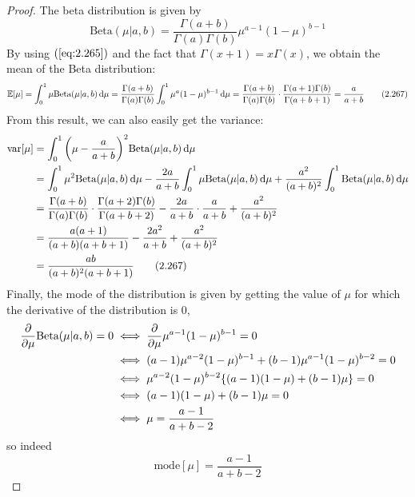 \vspace{1em}

\begin{proof}
    The beta distribution is given by
    \begin{equation*}
        \text{Beta}(\mu | a, b) = \frac{\Gamma(a + b)}{\Gamma(a)\Gamma(b)} \mu^{a - 1}(1 - \mu)^{b - 1}
        \tag{2.13}\label{eq:2.13}
    \end{equation*}
    By using $(\ref{eq:2.265})$ and the fact that $\Gamma(x + 1) = x\Gamma(x)$, we 
    obtain the mean of the Beta distribution:
    \begin{align*}
        \mathbb{E}[\mu] 
        = \int_{0}^{1} \mu \text{Beta}(\mu | a, b) \mathop{}\!\mathrm{d} \mu 
        = \frac{\Gamma(a + b)}{\Gamma(a)\Gamma(b)} \int_{0}^{1} \mu^a (1 - \mu)^{b - 1} \mathop{}\!\mathrm{d} \mu 
        = \frac{\Gamma(a+b)}{\Gamma(a)\Gamma(b)} \cdot \frac{\Gamma(a + 1)\Gamma(b)}{\Gamma(a + b + 1)}
        = \frac{a}{a + b}
        \tag{2.267}
    \end{align*}
    From this result, we can also easily get the variance:
    \begin{align*}
        \text{var}[\mu] 
        &= \int_{0}^{1} \bigg(\mu - \frac{a}{a + b}\bigg)^2 \text{Beta}(\mu | a,b) \mathop{}\!\mathrm{d} \mu \\
        &= \int_{0}^{1} \mu^2 \text{Beta}(\mu | a, b) \mathop{}\!\mathrm{d} \mu 
        - \frac{2a}{a + b} \int_{0}^{1} \mu\text{Beta}(\mu | a, b) \mathop{}\!\mathrm{d} \mu
        + \frac{a^2}{(a + b)^2} \int_{0}^{1} \text{Beta}(\mu | a, b) \mathop{}\!\mathrm{d} \mu \\
        &= \frac{\Gamma(a+b)}{\Gamma(a)\Gamma(b)} \cdot \frac{\Gamma(a + 2)\Gamma(b)}{\Gamma(a + b + 2)}
        - \frac{2a}{a+b} \cdot \frac{a}{a + b} + \frac{a^2}{(a+b)^2} \\
        &= \frac{a(a + 1)}{(a + b)(a + b + 1)} - \frac{2a^2}{a + b} + \frac{a^2}{(a + b)^2} \\
        &= \frac{ab}{(a + b)^2(a + b + 1)}
        \tag{2.267}
    \end{align*}
    Finally, the mode of the distribution is given by getting the value of
    $\mu$ for which the derivative of the distribution is 0,
    \begin{align*}
        \pdv{\mu} \text{Beta}(\mu | a, b) = 0 
        &\iff \pdv{\mu} \mu^{a - 1}(1 - \mu)^{b - 1} = 0 \\
        &\iff (a - 1)\mu^{a - 2}(1 - \mu)^{b - 1} + (b - 1)\mu^{a - 1}(1 - \mu)^{b - 2} = 0 \\
        &\iff \mu^{a - 2}(1 - \mu)^{b - 2}\{(a - 1)(1 - \mu) + (b - 1)\mu\} = 0 \\
        &\iff (a - 1)(1 - \mu) + (b - 1)\mu = 0 \\
        &\iff \mu = \frac{a - 1}{a + b - 2}
    \end{align*}
    so indeed
    \[
        \text{mode}[\mu] = \frac{a - 1}{a + b - 2} \tag{2.268}
    \] 
\end{proof}

